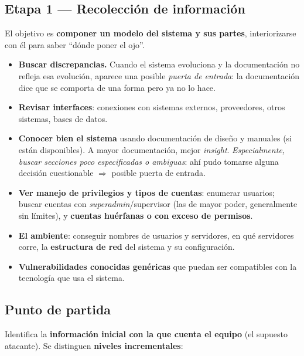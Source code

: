 \documentclass[11pt,a4paper]{article}
\begin{document}
\subsection{Etapa 1 — Recolección de información}

El objetivo es \textbf{componer un modelo del sistema y sus partes}, interiorizarse con él
para saber ``dónde poner el ojo''.

\begin{itemize}[leftmargin=1.6em,itemsep=3pt]
  \item \textbf{Buscar discrepancias.} Cuando el sistema evoluciona y la documentación no
        refleja esa evolución, aparece una posible \emph{puerta de entrada}: la documentación
        dice que se comporta de una forma pero ya no lo hace.
  \item \textbf{Revisar interfaces}: conexiones con sistemas externos, proveedores, otros
        sistemas, bases de datos.
  \item \textbf{Conocer bien el sistema} usando documentación de diseño y manuales (si están
        disponibles). A mayor documentación, mejor \emph{insight}.
        \emph{Especialmente, buscar secciones poco especificadas o ambiguas}: ahí pudo
        tomarse alguna decisión cuestionable $\Rightarrow$ posible puerta de entrada.
  \item \textbf{Ver manejo de privilegios y tipos de cuentas}: enumerar usuarios; buscar
        cuentas con \emph{superadmin}/supervisor (las de mayor poder, generalmente sin
        límites), y \textbf{cuentas huérfanas o con exceso de permisos}.
  \item \textbf{El ambiente}: conseguir nombres de usuarios y servidores, en qué servidores
        corre, la \textbf{estructura de red} del sistema y su configuración.
  \item \textbf{Vulnerabilidades conocidas genéricas} que puedan ser compatibles con la
        tecnología que usa el sistema.
\end{itemize}

\subsection{Punto de partida}

Identifica la \textbf{información inicial con la que cuenta el equipo} (el supuesto atacante).
Se distinguen \textbf{niveles incrementales}:
\end{document}
